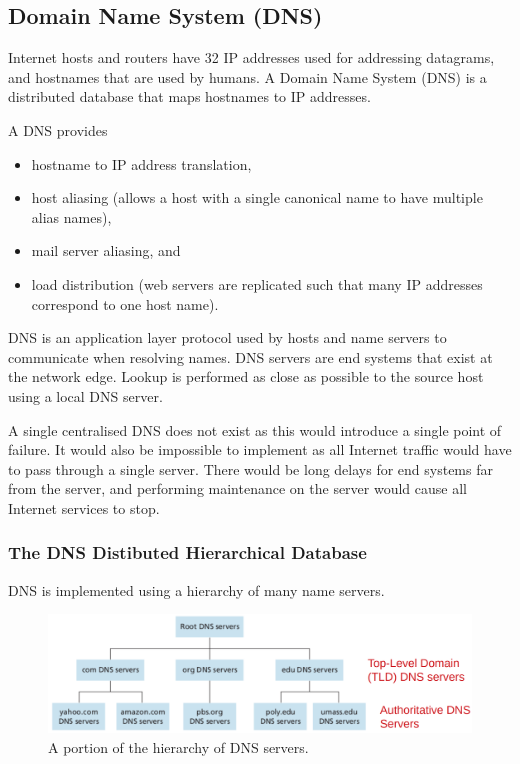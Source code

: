 \subsection{Domain Name System (DNS)}

Internet hosts and routers have \SI{32}{\bit} IP addresses used for addressing datagrams, and hostnames that are used by humans.
A Domain Name System (DNS) is a distributed database that maps hostnames to IP addresses.

A DNS provides
\begin{itemize}
  \item hostname to IP address translation,
  \item host aliasing (allows a host with a single canonical name to have multiple alias names),
  \item mail server aliasing, and
  \item load distribution (web servers are replicated such that many IP addresses correspond to one host name).
\end{itemize}

DNS is an application layer protocol used by hosts and name servers to communicate when resolving names.
DNS servers are end systems that exist at the network edge.
Lookup is performed as close as possible to the source host using a local DNS server.

A single centralised DNS does not exist as this would introduce a single point of failure.
It would also be impossible to implement as all Internet traffic would have to pass through a single server.
There would be long delays for end systems far from the server, and performing maintenance on the server would cause all Internet services to stop.

\subsubsection{The DNS Distibuted Hierarchical Database}

DNS is implemented using a hierarchy of many name servers.

\begin{figure}[htp]
  \centering
  \includegraphics[width=15cm]{unit-17/figures/dns-hierarchy.png}
  \caption*{A portion of the hierarchy of DNS servers.}
\end{figure}

